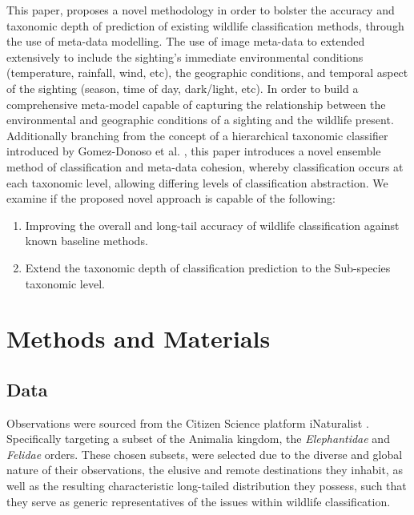 \documentclass[conference]{IEEEtran}
\begin{document}
    This paper, proposes a novel methodology in order to bolster the accuracy and taxonomic depth of prediction of existing wildlife classification methods, through the use of meta-data modelling. 
    The use of image meta-data to extended extensively to include the sighting's immediate environmental conditions (temperature, rainfall, wind, etc), the geographic conditions, and temporal aspect of the sighting (season, time of day, dark/light, etc). In order to build a comprehensive meta-model capable of capturing the relationship between the environmental and geographic conditions of a sighting and the wildlife present.
    Additionally branching from the concept of a hierarchical taxonomic classifier introduced by Gomez-Donoso et al. \cite{gomez-donoso_escalona_pérez-esteve_cazorla_2021}, this paper introduces a novel ensemble method of classification and meta-data cohesion, whereby classification occurs at each taxonomic level, allowing differing levels of classification abstraction. 
    We examine if the proposed novel approach is capable of the following: 
    \\
    
    \begin{enumerate}
        \item Improving the overall and long-tail accuracy of wildlife classification against known baseline methods. 
        \item Extend the taxonomic depth of classification prediction to the Sub-species taxonomic level.
    \end{enumerate}


    
\section{Methods and Materials}
    \subsection{Data}
    Observations were sourced from the Citizen Science platform iNaturalist \cite{iNaturalist}. Specifically targeting a subset of the Animalia kingdom, the \textit{Elephantidae} and \textit{Felidae} orders. These chosen subsets, were selected due to the diverse and global nature of their observations, the elusive and remote destinations they inhabit, as well as the resulting characteristic long-tailed distribution they possess, such that they serve as generic representatives of the issues within wildlife classification. 
\end{document}
